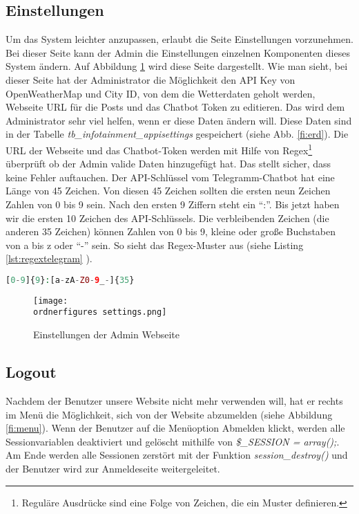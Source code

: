 \subsection{Einstellungen}
Um das System leichter anzupassen, erlaubt die Seite Einstellungen vorzunehmen. Bei dieser Seite kann der Admin die Einstellungen einzelnen Komponenten dieses System ändern. Auf Abbildung \ref{fi:settings} wird diese Seite dargestellt. Wie man sieht, bei dieser Seite hat der Administrator die Möglichkeit den API Key von OpenWeatherMap und City ID, von dem die Wetterdaten geholt werden, Webseite URL für die Posts und das Chatbot Token zu editieren. Das wird dem Administrator sehr viel helfen, wenn er diese Daten ändern will. Diese Daten sind in der Tabelle \textit{tb\_infotainment\_appisettings} gespeichert (siehe Abb. \ref{fi:erd}). Die URL der Webseite und das Chatbot-Token werden mit Hilfe von Regex\footnote{Reguläre Ausdrücke sind eine Folge von Zeichen, die ein Muster definieren.} überprüft ob der Admin valide Daten hinzugefügt hat. Das stellt sicher, dass keine Fehler auftauchen. Der API-Schlüssel vom Telegramm-Chatbot hat eine Länge von 45 Zeichen. Von diesen 45 Zeichen sollten die ersten neun Zeichen Zahlen von 0 bis 9 sein. Nach den ersten 9 Ziffern steht ein ``:''. Bis jetzt haben wir die ersten 10 Zeichen des API-Schlüssels. Die verbleibenden Zeichen (die anderen 35 Zeichen) können Zahlen von 0 bis 9, kleine oder große Buchstaben von a bis z oder ``-'' sein. So sieht das Regex-Muster aus (siehe Listing \ref{lst:regextelegram} ).
\begin{lstlisting}[caption={Regex Muster für Telegram Chatbot API-Key},label={lst:regextelegram},language=PHP]
[0-9]{9}:[a-zA-Z0-9_-]{35}
\end{lstlisting}

\begin{figure}[H]
	\centering
	\texttt{[image: \\ordnerfigures settings.png]}
	\caption{Einstellungen der Admin Webseite}
	\label{fi:settings}
\end{figure}

\subsection{Logout}
Nachdem der Benutzer unsere Website nicht mehr verwenden will, hat er rechts im Menü die Möglichkeit, sich von der Website abzumelden (siehe Abbildung \ref{fi:menu}). Wenn der Benutzer auf die Menüoption Abmelden klickt, werden alle Sessionvariablen deaktiviert und gelöscht mithilfe von \textit{\$\_SESSION = array();}. Am Ende werden alle Sessionen zerstört mit der Funktion \textit{session\_destroy()} und der Benutzer wird zur Anmeldeseite weitergeleitet.

